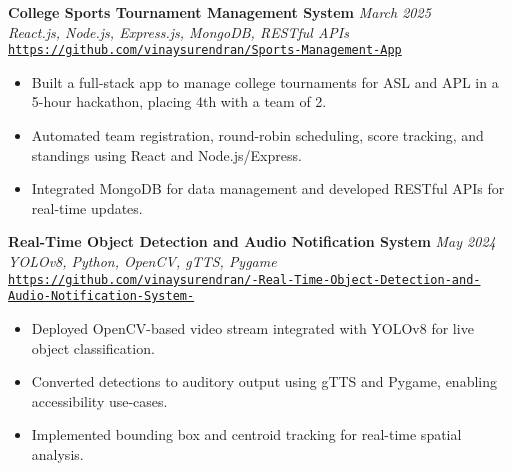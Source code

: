 \documentclass[letterpaper]{article}
\begin{document}
    \textbf{College Sports Tournament Management System} \hfill \textsl{March 2025} \\
    \textsl{React.js, Node.js, Express.js, MongoDB, RESTful APIs} \\
    \texttt{\href{https://github.com/vinaysurendran/Sports-Management-App}{https://github.com/vinaysurendran/Sports-Management-App}} \\
    \vspace{-2mm}
    \begin{itemize} \itemsep -1mm
        \item Built a full-stack app to manage college tournaments for ASL and APL in a 5-hour hackathon, placing 4th with a team of 2.
        \item Automated team registration, round-robin scheduling, score tracking, and standings using React and Node.js/Express.
        \item Integrated MongoDB for data management and developed RESTful APIs for real-time updates.
    \end{itemize}
    \vspace{-1mm}

    \textbf{Real-Time Object Detection and Audio Notification System} \hfill \textsl{May 2024} \\
    \textsl{YOLOv8, Python, OpenCV, gTTS, Pygame} \\ \texttt{\href{https://github.com/vinaysurendran/-Real-Time-Object-Detection-and-Audio-Notification-System-}{https://github.com/vinaysurendran/-Real-Time-Object-Detection-and-Audio-Notification-System-}} \\
    \vspace{-2mm}
    \begin{itemize} \itemsep -1mm
        \item Deployed OpenCV-based video stream integrated with YOLOv8 for live object classification.
        \item Converted detections to auditory output using gTTS and Pygame, enabling accessibility use-cases.
        \item Implemented bounding box and centroid tracking for real-time spatial analysis.
    \end{itemize}
    \vspace{-1mm}
\end{document}
